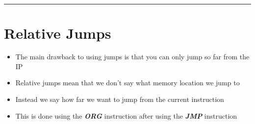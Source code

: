 \documentclass{article}
\begin{document}
\begin{center}
  \rule{0.5\textwidth}{0.4pt}
\end{center}

\section{Relative Jumps}
\begin{itemize}
  \item{The main drawback to using jumps is that you can only jump so far from the IP}
  \item{Relative jumps mean that we don't say what memory location we jump to}
  \item{Instead we say how far we want to jump from the current instruction}
  \item{This is done using the \textbf{\textit{ORG}} instruction after using the \textbf{\textit{JMP}} instruction}
\end{itemize}
\end{document}
